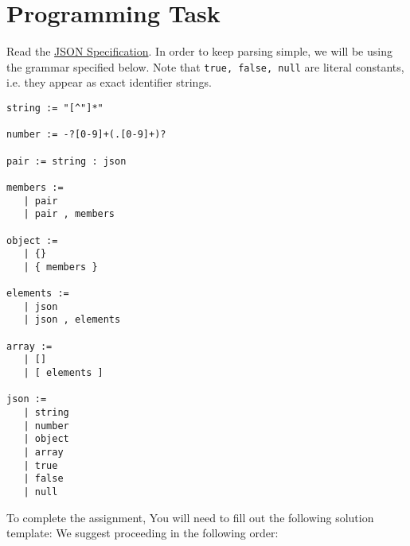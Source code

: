 \section{Programming Task}
Read the \href{https://www.json.org/}{JSON Specification}. In order to keep
parsing simple, we will be using the grammar specified below.
Note that \texttt{true, false, null} are literal constants,
i.e. they appear as exact identifier strings.
\begin{verbatim}
string := "[^"]*"

number := -?[0-9]+(.[0-9]+)?

pair := string : json

members :=
   | pair
   | pair , members

object :=
   | {}
   | { members }

elements :=
   | json
   | json , elements

array :=
   | []
   | [ elements ]

json :=
   | string
   | number
   | object
   | array
   | true
   | false
   | null
\end{verbatim}
To complete the assignment, You will need to fill out the following solution
template:
We suggest proceeding in the following order:
